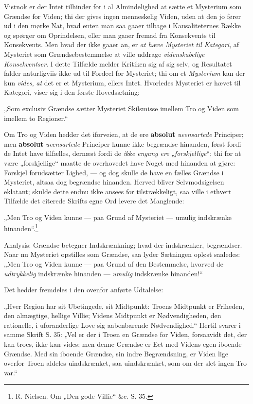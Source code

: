 \documentclass[12pt,a4paper]{book}
\newcommand{\opage}[1]{\marginnote{\footnotesize\textit{[#1]}}}
\begin{document}
Vistnok er der Intet tilhinder for i al Almindelighed
at sætte et Mysterium som Grændse for Viden;
thi der gives ingen menneskelig Viden, uden at den jo
fører ud i den mørke Nat, hvad enten man saa gaaer
tilbage i Kausaliteternes Række og spørger om Oprindelsen,
eller man gaaer fremad fra Konsekvents til Konsekvents.
Men hvad der ikke gaaer an, er \emph{at hæve
Mysteriet til Kategori}, af Mysteriet som Grændsebestemmelse
at ville uddrage \emph{videnskabelige Konsekventser}.
I dette Tilfælde melder Kritiken sig af sig selv,
og Resultatet falder naturligviis ikke ud til Fordeel for
Mysteriet; thi om et \emph{Mysterium} kan der kun \emph{vides},
\emph{at} det er et Mysterium, ellers Intet. Hvorledes Mysteriet
er hævet til Kategori, viser sig i den første Hovedsætning:

„Som exclusiv Grændse sætter Mysteriet Skilsmisse
imellem Tro og Viden som imellem to Regioner.“

Om Tro og Viden hedder det iforveien, at de ere
\textbf{absolut} \emph{ueensartede} Principer; men \textbf{absolut} \emph{ueensartede}
Principer kunne ikke begrændse hinanden, først
\opage{16}\setcounter{footnote}{0}%
fordi de Intet have tilfælles, dernæst fordi de \emph{ikke
engang ere} „\emph{forskjellige}“; thi for at være „forskjellige“
maatte de overhovedet have Noget med hinanden
at gjøre: Forskjel forudsætter Lighed, --- og dog skulle
de have en fælles Grændse i Mysteriet, altsaa dog begrændse
hinanden. Herved bliver Selvmodsigelsen eklatant;
skulde dette endnu ikke ansees for tilstrækkeligt, saa
ville i ethvert Tilfælde det citerede Skrifts egne Ord
levere det Manglende:

„Men Tro og Viden kunne --- paa Grund af
Mysteriet --- umulig indskrænke hinanden“.\footnote{R. Nielsen. Om „Den gode Villie“ \&c. S. 35.}

Analysis: Grændse betegner Indskrænkning; hvad der
indskrænker, begrændser. Naar nu Mysteriet opstilles
som Grændse, saa lyder Sætningen opløst saaledes:
„Men Tro og Viden kunne --- paa Grund af den
Bestemmelse, hvorved de \emph{udtrykkelig} indskrænke hinanden
--- \emph{umulig} indskrænke hinanden!“

Det hedder fremdeles i den ovenfor anførte Udtalelse:

„Hver Region har sit Ubetingede, sit Midtpunkt:
Troens Midtpunkt er Friheden, den almægtige, hellige
Villie; Videns Midtpunkt er Nødvendigheden, den rationelle,
i uforanderlige Love sig aabenbarende Nødvendighed.“
Hertil svarer i samme Skrift S. 35: „Vel
er der i Troen en Grændse for Viden, forsaavidt det,
der kan troes, ikke kan vides; men denne Grændse er
Eet med Videns egen iboende Grændse. Med sin iboende
Grændse, sin indre Begrændsning, er Viden lige%
\opage{17}\setcounter{footnote}{0}%
overfor Troen aldeles uindskrænket, saa uindskrænket, som
om der slet ingen Tro var.“
\end{document}
